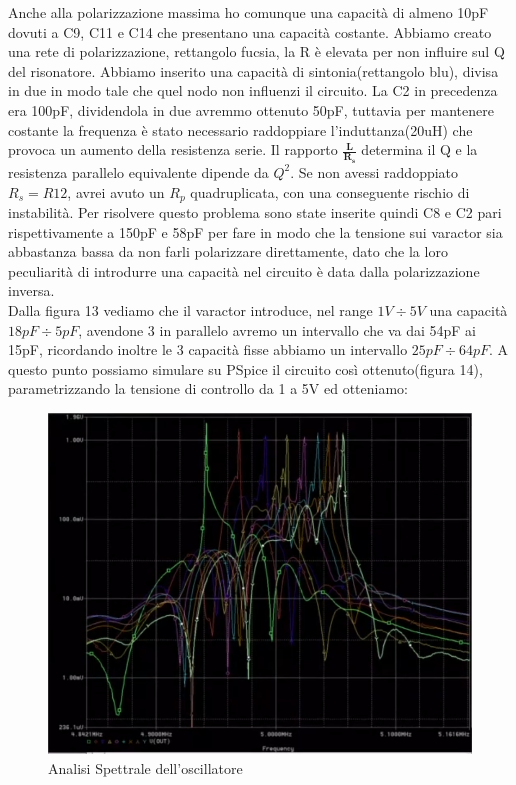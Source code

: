 \documentclass{article}
\begin{document}
Anche alla polarizzazione massima ho comunque una capacità di almeno 10pF dovuti  a C9, C11 e C14 che presentano una capacità costante.
Abbiamo creato una rete di polarizzazione, rettangolo fucsia, la R è elevata per non influire sul Q del risonatore.
Abbiamo inserito una capacità di sintonia(rettangolo blu), divisa in due in modo tale che quel nodo non influenzi il circuito.
La C2 in precedenza era 100pF, dividendola in due avremmo ottenuto 50pF, tuttavia per mantenere costante la frequenza è stato necessario raddoppiare l'induttanza(20uH) che provoca un aumento della resistenza serie.
Il rapporto \LARGE$\bm{\frac{L}{R_s}}$ \normalsize determina il Q e la resistenza parallelo equivalente dipende da $Q^2$.
Se non avessi raddoppiato $R_s=R12$, avrei avuto un $R_p$ quadruplicata, con una conseguente rischio di instabilità.
Per risolvere questo problema sono state inserite quindi C8 e C2 pari rispettivamente a 150pF e 58pF per fare in modo che la tensione sui varactor sia abbastanza bassa da non farli polarizzare direttamente, dato che la loro peculiarità di introdurre una capacità nel circuito è data dalla polarizzazione inversa.\\Dalla figura 13 vediamo che il varactor introduce, nel range $1V \div 5V$ una capacità $18pF \div 5pF$, avendone 3 in parallelo avremo un intervallo che va dai 54pF ai 15pF, ricordando inoltre le 3 capacità fisse abbiamo un intervallo $25pF \div 64pF$.
A questo punto possiamo simulare su PSpice il circuito così ottenuto(figura 14), parametrizzando la tensione di controllo da 1 a 5V ed otteniamo:
~\begin{figure}[H]
\includegraphics[width=\textwidth]{AnalisiSpettraleFinale.png}
\centering
\caption{Analisi Spettrale dell'oscillatore}
\label{fig:foo}
\end{figure}
\end{document}
